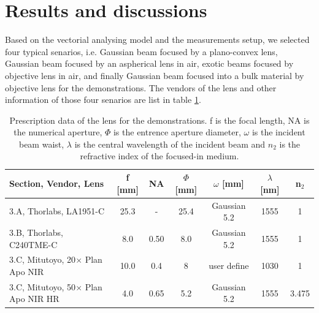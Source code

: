 \documentclass[9pt,twocolumn,twoside]{osajnl}
\begin{document}
\section{Results and discussions} \label{section:3}
Based on the vectorial analysing model and the measurements setup, we selected four typical senarios, i.e. Gaussian beam focused by a plano-convex lens, Gaussian beam focused by an aspherical lens in air, exotic beams focused by objective lens in air, and finally Gaussian beam focused into a bulk material by objective lens for the demonstrations. The vendors of the lens and other information of those four senarios are list in table \ref{tab:1}.
\begin{table}
	\centering
	\begin{tabular}[c]{|l|c|c|c|c|c|c|}
		\hline
		\rowcolor{gray}
		Section, Vendor, Lens& f [mm]& NA & $\Phi$ [mm] & $\omega$ [mm] & $\lambda$ [nm]&n$_2$ \\
		\hline
		3.A, Thorlabs, LA1951-C & 25.3 & - & 25.4 & Gaussian 5.2 & 1555 & 1 \\
		\rowcolor{lightgray}
		3.B, Thorlabs, C240TME-C & 8.0 & 0.50 & 8.0 & Gaussian 5.2 & 1555 & 1\\
		3.C, Mitutoyo, 20$\times$ Plan Apo NIR & 10.0 & 0.4 & 8 & user define & 1030 & 1\\
		\rowcolor{lightgray}
		3.C, Mitutoyo, 50$\times$ Plan Apo NIR HR & 4.0 & 0.65 & 5.2 & Gaussian 5.2 & 1555 & 3.475\\
		\hline
	\end{tabular}	
	\caption{Prescription data of the lens for the demonstrations. f is the focal length, NA is the numerical aperture, $\Phi$ is the entrence aperture diameter, $\omega$ is the incident beam waist, $\lambda$ is the central wavelength of the incident beam and $n_2$ is the refractive index of the focused-in medium.}\label{tab:1}
\end{table}
\end{document}
